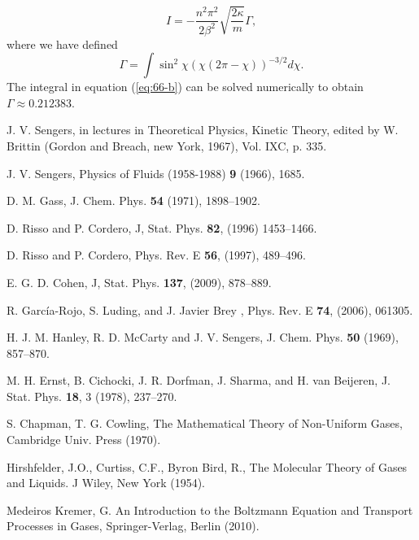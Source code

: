 \documentclass[11pt]{article} %
\begin{document}
\begin{equation}
I=-\frac{n^{2}\pi^{2}}{2\beta^{2}}\sqrt{\frac{2\kappa}{m}}\Gamma,\label{53-2-1}
\end{equation}
where we have defined 
\begin{equation}
\Gamma=\int\sin^{2}\chi\left(\chi\left(2\pi-\chi\right)\right)^{-3/2}d\chi.\label{eq:66-b}
\end{equation}
The integral in equation (\ref{eq:66-b}) can be solved numerically
to obtain $\Gamma\approx0.212383$.

\begin{thebibliography}{99}

 J. V. Sengers, in lectures in Theoretical Physics,
Kinetic Theory, edited by W. Brittin (Gordon and Breach, new York,
1967), Vol. IXC, p. 335.

 J. V. Sengers, Physics of Fluids (1958-1988)
\textbf{9} (1966), 1685.

 D. M. Gass, J. Chem. Phys. \textbf{54} (1971),
1898--1902.

 D. Risso and P. Cordero, J, Stat. Phys. \textbf{82},
(1996) 1453--1466.

 D. Risso and P. Cordero, Phys. Rev. E \textbf{56},
(1997), 489--496.

 E. G. D. Cohen, J, Stat. Phys. \textbf{137}, (2009),
878--889.

 R. Garc\'{i}a-Rojo, S. Luding, and J. Javier
Brey , Phys. Rev. E \textbf{74}, (2006), 061305.

 H. J. M. Hanley, R. D. McCarty and J. V. Sengers,
J. Chem. Phys. \textbf{50} (1969), 857--870.

 M. H. Ernst, B. Cichocki, J. R. Dorfman, J. Sharma,
and H. van Beijeren, J. Stat. Phys. \textbf{18}, 3 (1978), 237--270.

 S. Chapman, T. G. Cowling, The Mathematical Theory
of Non-Uniform Gases, Cambridge Univ. Press (1970).

 Hirshfelder, J.O., Curtiss, C.F., Byron
Bird, R., The Molecular Theory of Gases and Liquids. J Wiley, New
York (1954).

 Medeiros Kremer, G. An Introduction to the Boltzmann
Equation and Transport Processes in Gases, Springer-Verlag, Berlin
(2010). 

\end{thebibliography}
\end{document}
